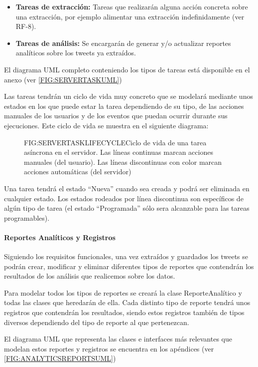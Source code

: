 \begin{itemize}
	\item \textbf{Tareas de extracción:} Tareas que realizarán alguna acción concreta sobre una extracción, por ejemplo alimentar una extracción indefinidamente (ver RF-8).
	\item \textbf{Tareas de análisis:} Se encargarán de generar y/o actualizar reportes analíticos sobre los tweets ya extraídos.
\end{itemize}

El diagrama UML completo conteniendo los tipos de tareas está disponible en el anexo (ver \ref{FIG:SERVERTASKUML}) 

Las tareas tendrán un ciclo de vida muy concreto que se modelará mediante unos estados en los que puede estar la tarea dependiendo de su tipo, de las acciones manuales de los usuarios y de los eventos que puedan ocurrir durante sus ejecuciones.
Este ciclo de vida se muestra en el siguiente diagrama:

\begin{figure}[Ciclo de vida de una tarea asíncrona]{FIG:SERVERTASKLIFECYCLE}{Ciclo de vida de una tarea asíncrona en el servidor. Las líneas continuas marcan acciones manuales (del usuario). Las líneas discontinuas con color marcan acciones automáticas (del servidor)}
\end{figure}
Una tarea tendrá el estado ``Nueva'' cuando sea creada y podrá ser eliminada en cualquier estado. Los estados rodeados por línea discontinua son específicos de algún tipo de tarea (el estado ``Programada'' sólo sera alcanzable para las tareas programables).
\paragraph{Reportes Analíticos y Registros}
Siguiendo los requisitos funcionales, una vez extraídos y guardados los tweets se podrán crear, modificar y eliminar diferentes tipos de reportes que contendrán los resultados de los análisis que realicemos sobre los datos.

Para modelar todos los tipos de reportes se creará la clase ReporteAnalítico y todas las clases que heredarán de ella.
Cada distinto tipo de reporte tendrá unos registros que contendrán los resultados, siendo estos registros también de tipos diversos dependiendo del tipo de reporte al que pertenezcan.

El diagrama UML que representa las clases e interfaces más relevantes que modelan estos reportes y registros se encuentra en los apéndices (ver \ref{FIG:ANALYTICSREPORTSUML})
